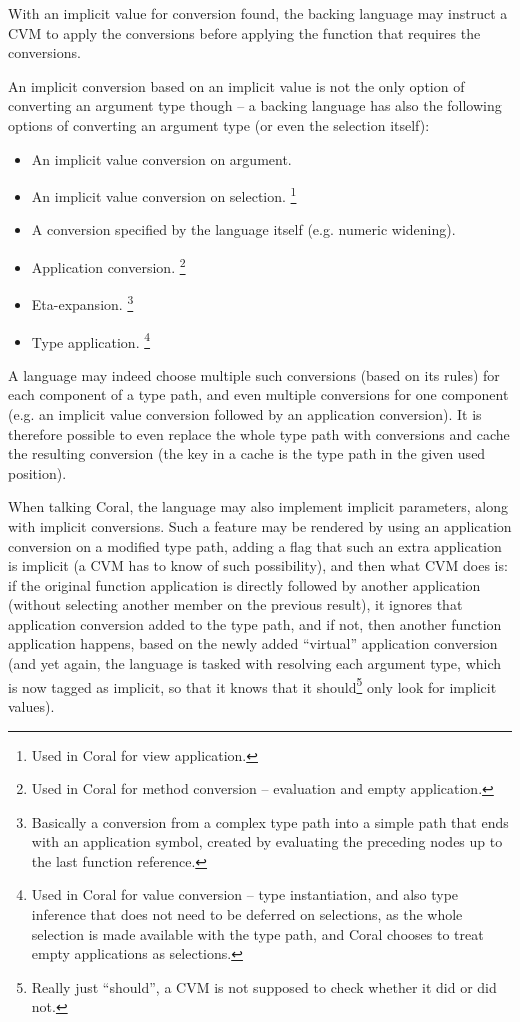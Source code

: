 With an implicit value for conversion found, the backing language may instruct a CVM to apply the conversions before applying the function that requires the conversions. 

An implicit conversion based on an implicit value is not the only option of converting an argument type though -- a backing language has also the following options of converting an argument type (or even the selection itself): 

\begin{itemize}
\item An implicit value conversion on argument. 
\item An implicit value conversion on selection. \footnote{Used in Coral for view application.}
\item A conversion specified by the language itself (e.g. numeric widening). 
\item Application conversion. \footnote{Used in Coral for method conversion -- evaluation and empty application.}
\item Eta-expansion. \footnote{Basically a conversion from a complex type path into a simple path that ends with an application symbol, created by evaluating the preceding nodes up to the last function reference.}
\item Type application. \footnote{Used in Coral for value conversion -- type instantiation, and also type inference that does not need to be deferred on selections, as the whole selection is made available with the type path, and Coral chooses to treat empty applications as selections.}
\end{itemize}

A language may indeed choose multiple such conversions (based on its rules) for each component of a type path, and even multiple conversions for one component (e.g. an implicit value conversion followed by an application conversion). It is therefore possible to even replace the whole type path with conversions and cache the resulting conversion (the key in a cache is the type path in the given used position). 

When talking Coral, the language may also implement implicit parameters, along with implicit conversions. Such a feature may be rendered by using an application conversion on a modified type path, adding a flag that such an extra application is implicit (a CVM has to know of such possibility), and then what CVM does is: if the original function application is directly followed by another application (without selecting another member on the previous result), it ignores that application conversion added to the type path, and if not, then another function application happens, based on the newly added ``virtual'' application conversion (and yet again, the language is tasked with resolving each argument type, which is now tagged as implicit, so that it knows that it should\footnote{Really just ``should'', a CVM is not supposed to check whether it did or did not.} only look for implicit values). 





